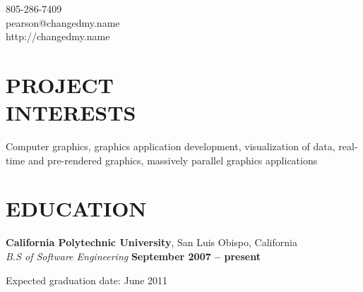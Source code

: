 \documentclass[margin,line]{resume}
\begin{document}
{
    \sc
    \hfill 805-286-7409                   \vspace{0mm}\\\vspace{0mm}%
    \hfill pearson@changedmy.name         \vspace{0mm}\\\vspace{0mm}%
    \hfill http://changedmy.name          \vspace{0mm}\\\vspace{-9mm}%
}

\begin{resume}

\vspace{6mm}

    \section{\mysidestyle \textbf{\large{P}\small{ROJECT\\INTERESTS}}}

  Computer graphics, graphics application development, visualization of data, real-time and pre-rendered graphics, massively parallel graphics applications

\sectionline

    \section{\mysidestyle \textbf{\large{E}\small{DUCATION}}}

    \textbf{\listing California Polytechnic University}, San Luis Obispo, California \vspace{2mm}\\\vspace{1mm}%
    \textsl{B.S of Software Engineering} \hfill \textbf{ September 2007 -- present}\vspace{-3mm}\\\vspace{-1mm}%
    \begin{list2}
        \item Expected graduation date: June 2011
    \end{list2}\vspace{-1.5mm}



\end{resume}
\end{document}
